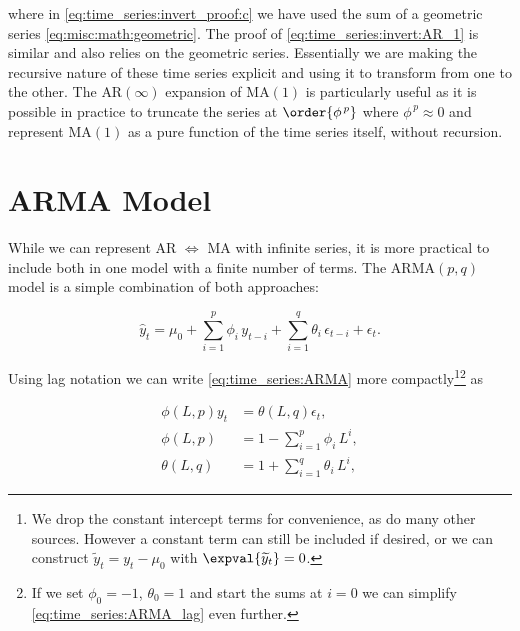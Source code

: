 \noindent where in \cref{eq:time_series:invert_proof:c} we have used
the sum of a geometric series \cref{eq:misc:math:geometric}.
The proof of \cref{eq:time_series:invert:AR_1} is similar and also relies on the geometric series.
Essentially we are making the recursive nature of these time series explicit and using it to transform from one to the other.
The $\text{AR}\left(\infty\right)$ expansion of $\text{MA}\left(1\right)$
is particularly useful as it is possible in practice to truncate the series at $\order{\phi^{\,p}}$
where $\phi^{\,p} \approx 0$ and represent $\text{MA}\left(1\right)$ as
a pure function of the time series itself, \ie without recursion.

\section{ARMA Model}
\label{time_series:ARMA}

While we can represent AR $\Leftrightarrow$ MA with infinite series,
it is more practical to include both in one model with a finite number of terms.
The $\text{ARMA}\left(p,q\right)$ model is a simple combination of
both approaches:

\begin{equation}\label{eq:time_series:ARMA}
\hat{y}_{t} = \mu_{0} + \sum_{i=1}^{p} \phi_{i}\, y_{t-i} + \sum_{i=1}^{q} \theta_{i}\, \epsilon_{t-i} + \epsilon_{t}.
\end{equation}

Using lag notation we can write \cref{eq:time_series:ARMA} more
compactly\footnote{We drop
the constant intercept terms for convenience, as do many other sources.
However a constant term can still be included if desired,
or we can construct $\widetilde{y}_{t} = y_{t} - \mu_{0}$ with $\expval{\widetilde{y}_{t}} = 0$.}\footnote{If we set
$\phi_{0}=-1$, $\theta_{0} = 1$ and start the sums at $i=0$
we can simplify \cref{eq:time_series:ARMA_lag} even further.} as

\begin{subequations}\label{eq:time_series:ARMA_lag}
\begin{align}
\phi\left(L,p\right) y_{t} &= \theta\left(L,q\right) \epsilon_{t}, \label{eq:time_series:ARMA_lag:def} \\
\phi\left(L,p\right) &= 1 - \sum_{i=1}^{p} \phi_{i}\, L^{i}, \label{eq:time_series:ARMA_lag:phi} \\
\theta\left(L,q\right) &= 1 + \sum_{i=1}^{q} \theta_{i}\, L^{i}, \label{eq:time_series:ARMA_lag:theta}
\end{align}
\end{subequations}

